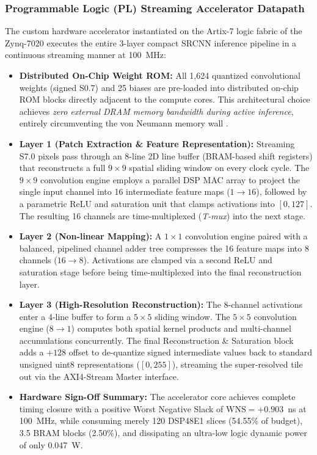 \documentclass[conference]{IEEEtran}
\begin{document}
\subsubsection{Programmable Logic (PL) Streaming Accelerator Datapath}
The custom hardware accelerator instantiated on the Artix-7 logic fabric of the Zynq-7020 executes the entire 3-layer compact SRCNN inference pipeline in a continuous streaming manner at 100~MHz:
\begin{itemize}
    \item \textbf{Distributed On-Chip Weight ROM:} All 1,624 quantized convolutional weights (signed S0.7) and 25 biases are pre-loaded into distributed on-chip ROM blocks directly adjacent to the compute cores. This architectural choice achieves \textit{zero external DRAM memory bandwidth during active inference}, entirely circumventing the von Neumann memory wall \cite{sze2017efficient}.
    \item \textbf{Layer 1 (Patch Extraction \& Feature Representation):} Streaming S7.0 pixels pass through an 8-line 2D line buffer (BRAM-based shift registers) that reconstructs a full $9 \times 9$ spatial sliding window on every clock cycle. The $9 \times 9$ convolution engine employs a parallel DSP MAC array to project the single input channel into 16 intermediate feature maps ($1 \rightarrow 16$), followed by a parametric ReLU and saturation unit that clamps activations into $[0, 127]$. The resulting 16 channels are time-multiplexed (\textit{T-mux}) into the next stage.
    \item \textbf{Layer 2 (Non-linear Mapping):} A $1 \times 1$ convolution engine paired with a balanced, pipelined channel adder tree compresses the 16 feature maps into 8 channels ($16 \rightarrow 8$). Activations are clamped via a second ReLU and saturation stage before being time-multiplexed into the final reconstruction layer.
    \item \textbf{Layer 3 (High-Resolution Reconstruction):} The 8-channel activations enter a 4-line buffer to form a $5 \times 5$ sliding window. The $5 \times 5$ convolution engine ($8 \rightarrow 1$) computes both spatial kernel products and multi-channel accumulations concurrently. The final Reconstruction \& Saturation block adds a $+128$ offset to de-quantize signed intermediate values back to standard unsigned uint8 representations ($[0, 255]$), streaming the super-resolved tile out via the AXI4-Stream Master interface.
    \item \textbf{Hardware Sign-Off Summary:} The accelerator core achieves complete timing closure with a positive Worst Negative Slack of $\text{WNS} = +0.903$~ns at 100~MHz, while consuming merely 120 DSP48E1 slices (54.55\% of budget), 3.5 BRAM blocks (2.50\%), and dissipating an ultra-low logic dynamic power of only 0.047~W.
\end{itemize}
\end{document}
